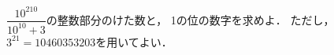\documentclass[../../main.tex]{subfiles}
\begin{document}
$\displaystyle\dfrac{10^{210}}{10^{10}+3}$の整数部分のけた数と，
1の位の数字を求めよ．
ただし，$3^{21}=10460353203$を用いてよい．
\end{document}
